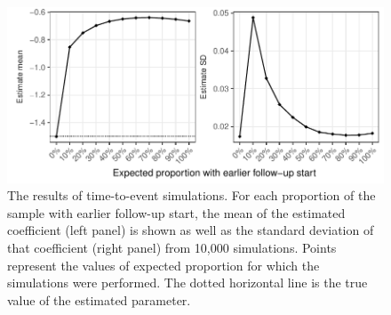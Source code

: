\begin{figure}[htp]
	\centering
	\includegraphics[width=1\textwidth]{../cox-tarprop-plot/long.pdf}
	\caption{
	The results of time-to-event simulations. For each proportion of the sample with earlier follow-up start, the mean of the estimated coefficient (left panel) is shown as well as the standard deviation of that coefficient (right panel) from 10,000 simulations. Points represent the values of expected proportion for which the simulations were performed. The dotted horizontal line is the true value of the estimated parameter.
	}
	\label{CoxSimLong}
\end{figure}
